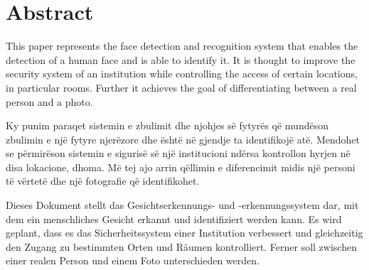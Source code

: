 \chapter*{Abstract}


\begin{flushleft}
	This paper represents the face detection and recognition system that enables the detection of a human face and is able to identify it. It is thought to improve the security system of an institution while controlling the access of certain locations, in particular rooms. Further it achieves the goal of differentiating between a real person and a photo. \\
\end{flushleft}
\begin{flushleft}
	Ky punim paraqet sistemin e zbulimit dhe njohjes së fytyrës që mundëson zbulimin e një fytyre njerëzore dhe është në gjendje ta identifikojë atë. Mendohet se përmirëson sistemin e sigurisë së një institucioni ndërsa kontrollon hyrjen në disa lokacione, dhoma. Më tej ajo arrin qëllimin e diferencimit midis një personi të vërtetë dhe një fotografie që identifikohet.
\end{flushleft}
\begin{flushleft}
	Dieses Dokument stellt das Gesichtserkennungs- und -erkennungssystem dar, mit dem ein menschliches Gesicht erkannt und identifiziert werden kann. Es wird geplant, dass es das Sicherheitssystem einer Institution verbessert und gleichzeitig den Zugang zu bestimmten Orten und Räumen kontrolliert. Ferner soll zwischen einer realen Person und einem Foto unterschieden werden. \\
\end{flushleft}